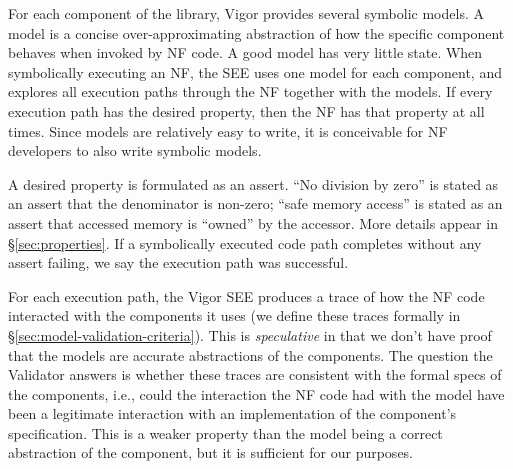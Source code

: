 \documentclass[letterpaper,twocolumn,10pt]{article}
\begin{document}


For each component of the library, Vigor provides several symbolic models. A model is a concise over-approximating abstraction of how the specific component behaves when invoked by NF code. A good model has very little state. When symbolically executing an NF, the SEE uses one model for each component, and explores all execution paths through the NF together with the models. If every execution path has the desired property, then the NF has that property at all times. Since models are relatively easy to write, it is conceivable for NF developers to also write symbolic models.

A desired property is formulated as an assert. ``No division by zero''  is stated as an assert that the denominator is non-zero; ``safe memory access'' is stated as an assert that accessed memory is ``owned'' by the accessor. More details appear in \S\ref{sec:properties}. If a symbolically executed code path completes without any assert failing, we say the execution path was successful.

For each execution path, the Vigor SEE produces a trace of how the NF code interacted with the components it uses (we define these traces formally in \S\ref{sec:model-validation-criteria}). This is  {\em speculative} in that we don't have proof that the models are accurate abstractions of the components. The question the Validator answers is whether these traces are consistent with the formal specs of the components, i.e., could the interaction the NF code had with the model have been a legitimate interaction with an implementation of the component's specification. This is a weaker property than the model being a correct abstraction of the component, but it is sufficient for our purposes.
\end{document}
